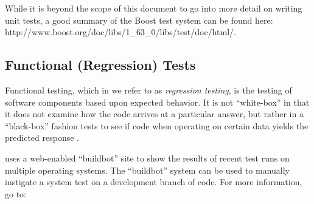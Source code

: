 While it is beyond the scope of this document to go into more detail
on writing unit tests, a good summary of the Boost test system can be
found here: http://www.boost.org/doc/libs/1\_63\_0/libs/test/doc/html/.


\subsection{Functional (Regression) Tests}
Functional testing, which in {\nek} we refer to as {\em regression testing},
is the testing of software components based upon expected
behavior.  It is not ``white-box'' in that it does not examine how the
code arrives at a particular answer, but rather in a ``black-box''
fashion tests to see if code when operating on certain data yields the
predicted response \cite{KFN-testing}.

{\nek} uses a web-enabled ``buildbot'' site to show the results of
recent test runs on multiple operating systems.  The ``buildbot''
system can be used to manually instigate a {\nek} system test on a
development branch of code.  For more information, go to:


%


